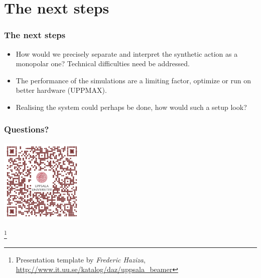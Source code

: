 \documentclass[aspectratio=169]{beamer}
\newcommand\blfootnote[1]{%
\begingroup
\renewcommand\thefootnote{}\footnote{#1}%
\addtocounter{footnote}{-1}%
\endgroup
}
\begin{document}
\section{The next steps}
\begin{frame}
        \frametitle{The next steps}
        \begin{itemize}
                \item How would we precisely separate and interpret the synthetic action as
                        a monopolar one? Technical difficulties need be addressed.
                \item The performance of the simulations are a limiting factor, optimize
                        or run on better hardware (UPPMAX).
                \item Realising the system could perhaps be done, how would such a setup
                        look?
        \end{itemize}
\end{frame}
\begin{frame}
        \frametitle{Questions?}
        \begin{center}
        \includegraphics[width=0.3\textwidth]{qr-code}
        \end{center}
\blfootnote{Presentation template by \textit{Frederic Haziza},
        \url{http://www.it.uu.se/katalog/daz/uppsala_beamer}}
\end{frame}
\end{document}
